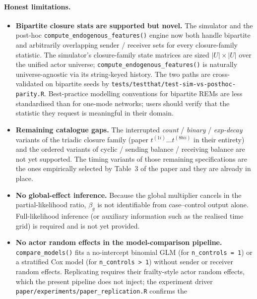 \documentclass[11pt,a4paper]{article}
\begin{document}
\paragraph{Honest limitations.}
\begin{itemize}
\item \textbf{Bipartite closure stats are supported but novel.}
      The simulator and the post-hoc
      \texttt{compute\_endogenous\_features()} engine now both
      handle bipartite and arbitrarily overlapping sender /
      receiver sets for every closure-family statistic. The
      simulator's closure-family state matrices are sized
      $|U| \times |U|$ over the unified actor universe;
      \texttt{compute\_endogenous\_features()} is naturally
      universe-agnostic via its string-keyed history. The two
      paths are cross-validated on bipartite seeds by
      \texttt{tests/testthat/test-sim-vs-posthoc-parity.R}.
      Best-practice modelling conventions for bipartite REMs are
      less standardised than for one-mode networks; users should
      verify that the statistic they request is meaningful in
      their domain.
\item \textbf{Remaining catalogue gaps.}  The interrupted
      \emph{count} / \emph{binary} / \emph{exp-decay} variants of
      the triadic closure family
      (paper $t^{(1i)}\ldots t^{(8bii)}$ in their entirety) and
      the ordered variants of cyclic / sending balance / receiving
      balance are not yet supported. The timing variants of those
      remaining specifications are the ones empirically selected
      by Table~3 of the paper and they are already in place.
\item \textbf{No global-effect inference.}  Because the global
      multiplier cancels in the partial-likelihood ratio,
      $\beta_g$ is not identifiable from case--control output
      alone.  Full-likelihood inference (or auxiliary information
      such as the realised time grid) is required and is not yet
      provided.
\item \textbf{No actor random effects in the model-comparison
      pipeline.}  \texttt{compare\_models()} fits a no-intercept
      binomial GLM (for \texttt{n\_controls = 1}) or a stratified
      Cox model (for \texttt{n\_controls > 1}) without sender or
      receiver random effects.  Replicating
      \citet[Table 3]{juozaitiene2024about} requires their
      frailty-style actor random effects, which the present
      pipeline does not inject; the experiment driver
      \texttt{paper/experiments/paper\_replication.R} confirms the

\end{itemize}
\end{document}
